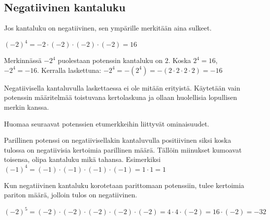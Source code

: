 
\subsection{Negatiivinen kantaluku}

Jos kantaluku on negatiivinen, sen ympärille merkitään aina sulkeet.

\begin{esimerkki}
$(-2)^4 = -2 \cdot (-2)\cdot(-2)\cdot(-2) = 16$

Merkinnässä $-2^4$ puolestaan potenssin kantaluku on $2$. Koska $2^4 = 16$, $-2^4=-16$. Kerralla laskettuna: $-2^4 =-(2^4)= -(2 \cdot 2\cdot 2 \cdot 2) = -16$
\end{esimerkki}

Negatiivisella kantaluvulla laskettaessa ei ole mitään erityistä. Käytetään vain potenssin määritelmää toistuvana kertolaskuna ja ollaan huolellisia lopullisen merkin kanssa.
 
\begin{esimerkki}
\end{esimerkki}
    
Huomaa seuraavat potenssien etumerkkeihin liittyvät ominaisuudet.


Parillinen potenssi on negatiivisellakin kantaluvulla positiivinen siksi koska tulossa on negatiivisia kertoimia parillinen määrä. Tällöin miinukset kumoavat toisensa, olipa kantaluku mikä tahansa.  Esimerkiksi $(-1)^4=(-1) \cdot (-1) \cdot (-1) \cdot (-1)= 1\cdot 1=1$

Kun negatiivinen kantaluku korotetaan parittomaan potenssiin, tulee kertoimia pariton määrä, jolloin tulos on negatiivinen.
\begin{esimerkki}

$(-2)^5=(-2) \cdot (-2) \cdot (-2) \cdot (-2) \cdot (-2)=4\cdot4\cdot(-2)=16\cdot(-2)= -32$
\end{esimerkki}

